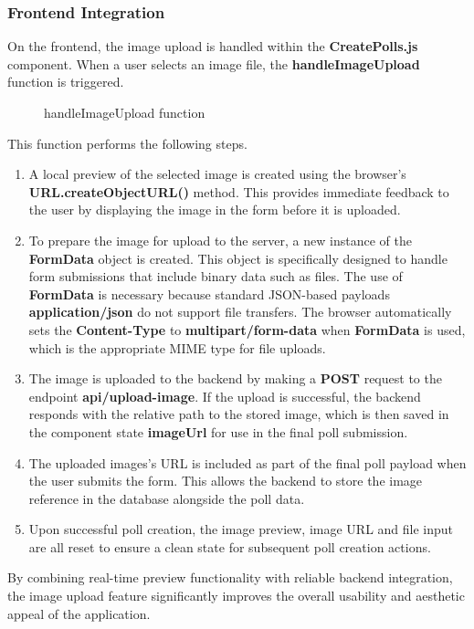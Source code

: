 \documentclass[a4paper,12pt]{report}
\begin{document}
\subsubsection{Frontend Integration}
On the frontend, the image upload is handled within the \textbf{CreatePolls.js} component. When a user selects an image file, the \textbf{handleImageUpload} function is triggered. 
\begin{figure}[H]
	\caption{handleImageUpload function}
	\label{fig:handleImageUpload}
\end{figure}
This function performs the following steps.
\begin{enumerate}
	\item A local preview of the selected image is created using the browser's \textbf{URL.createObjectURL()} method. This provides immediate feedback to the user by displaying the image in the form before it is uploaded.
	\item To prepare the image for upload to the server, a new instance of the \textbf{FormData} object is created. This object is specifically designed to handle form submissions that include binary data such as files. The use of \textbf{FormData} is necessary because standard JSON-based payloads \textbf{application/json} do not support file transfers. The browser automatically sets the \textbf{Content-Type} to \textbf{multipart/form-data} when \textbf{FormData} is used, which is the appropriate MIME type for file uploads.
	\item The image is uploaded to the backend by making a \textbf{POST} request to the endpoint \textbf{api/upload-image}. If the upload is successful, the backend responds with the relative path to the stored image, which is then saved in the component state \textbf{imageUrl} for use in the final poll submission.
	\item The uploaded images's URL is included as part of the final poll payload when the user submits the form. This allows the backend to store the image reference in the database alongside the poll data.
	\item Upon successful poll creation, the image preview, image URL and file input are all reset to ensure a clean state for subsequent poll creation actions.
\end{enumerate}
By combining real-time preview functionality with reliable backend integration, the image upload feature significantly improves the overall usability and aesthetic appeal of the application.
\end{document}
